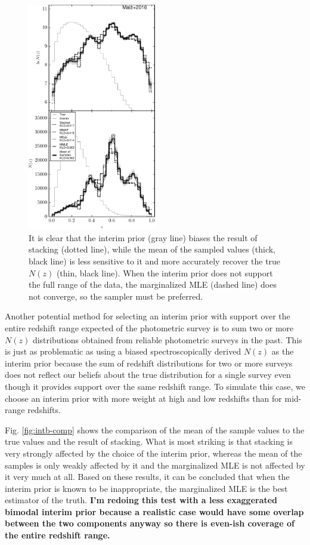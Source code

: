\documentclass[preprint]{aastex}
\begin{document}
\begin{figure}
\includegraphics[width=0.5\textwidth]{figs/uint/comps.pdf}
\caption{It is clear that the interim prior (gray line) biases the result of 
stacking (dotted line), while the mean of the sampled values (thick, black 
line) is less sensitive to it and more accurately recover the true $N(z)$ 
(thin, black line).  When the interim prior does not support the full range of 
the data, the marginalized MLE (dashed line) does not converge, so the sampler 
must be preferred.}
\label{fig:intu-comp}
\end{figure}

Another potential method for selecting an interim prior with support over the 
entire redshift range expected of the photometric survey is to sum two or more 
$N(z)$ distributions obtained from reliable photometric surveys in the past.  
This is just as problematic as using a biased spectroscopically derived $N(z)$ 
as the interim prior because the sum of redshift distributions for two or more 
surveys does not reflect our beliefs about the true distribution for a single 
survey even though it provides support over the same redshift range.  To 
simulate this case, we choose an interim prior with more weight at high and low 
redshifts than for mid-range redshifts.  

Fig. \ref{fig:intb-comp} shows the comparison of the mean of the sample values 
to the true values and the result of stacking.  What is most striking is that 
stacking is very strongly affected by the choice of the interim prior, whereas 
the mean of the samples is only weakly affected by it and the marginalized MLE 
is not affected by it very much at all.  Based on these results, it can be 
concluded that when the interim prior is known to be inappropriate, the 
marginalized MLE is the best estimator of the truth.  \textbf{I'm redoing this 
test with a less exaggerated bimodal interim prior because a realistic case 
would have some overlap between the two components anyway so there is even-ish 
coverage of the entire redshift range.}
\end{document}
